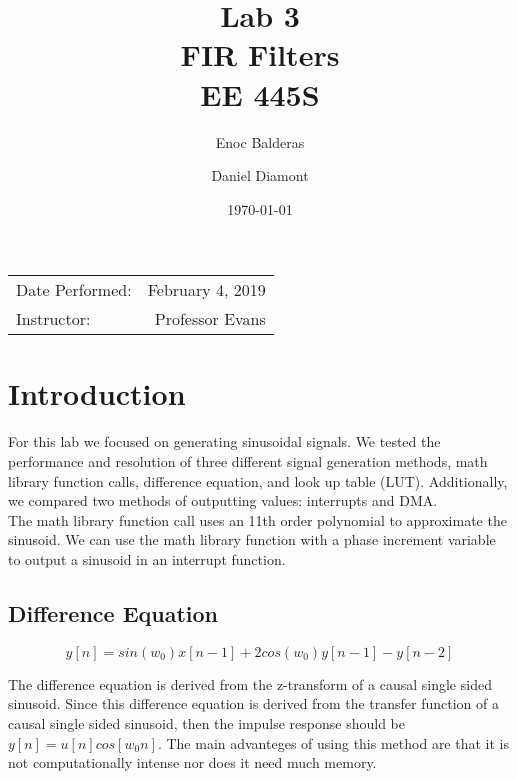 \documentclass{article}
\title{Lab 3\\ FIR Filters\\ EE 445S} %
\author{Enoc Balderas\\
        \and
        Daniel Diamont\\} %
\date{\today} %
\begin{document}
\maketitle %

\begin{center}
\begin{tabular}{l r}
Date Performed: & February 4, 2019 \\ %
Instructor: & Professor Evans %
\end{tabular}
\end{center}



\section{Introduction}

For this lab we focused on generating sinusoidal signals. 
We tested the performance and resolution of three different signal generation methods, math library function calls, difference equation, and look up table (LUT).
Additionally, we compared two methods of outputting values: interrupts and DMA.\\

The math library function call uses an 11th order polynomial to approximate the sinusoid.
We can use the math library function with a phase increment variable to output a sinusoid in an interrupt function.

\subsection{Difference Equation}

\begin{equation}
y[n] = sin(w_0)x[n-1] + 2cos(w_0)y[n-1] - y[n-2]
\end{equation}

The difference equation is derived from the z-transform of a causal single sided sinusoid.
Since this difference equation is derived from the transfer function of a causal single sided sinusoid, then the impulse response should be $y[n] = u[n]cos[w_0n]$.
The main advanteges of using this method are that it is not computationally intense nor does it need much memory.
\end{document}
